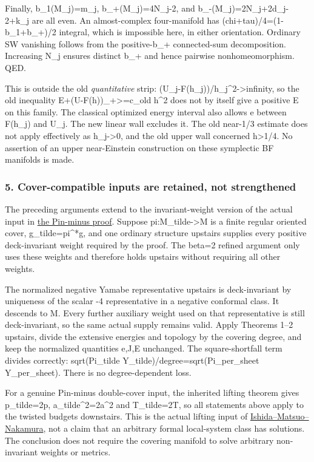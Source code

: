 \documentclass[
  10pt,
]{article}
\begin{document}
Finally, b\_1(M\_j)=m\_j, b\_+(M\_j)=4N\_j-2, and
b\_-(M\_j)=2N\_j+2d\_j-2+k\_j are all even. An almost-complex
four-manifold has (chi+tau)/4=(1-b\_1+b\_+)/2 integral, which is
impossible here, in either orientation. Ordinary SW vanishing follows
from the positive-b\_+ connected-sum decomposition. Increasing N\_j
ensures distinct b\_+ and hence pairwise nonhomeomorphism. QED.

This is outside the old \emph{quantitative} strip:
(U\_j-F(h\_j))/h\_j\^{}2-\textgreater infinity, so the old inequality
E+(U-F(h))\_+\textgreater=c\_old h\^{}2 does not by itself give a
positive E on this family. The classical optimized energy interval also
allows e between F(h\_j) and U\_j. The new linear wall excludes it. The
old near-1/3 estimate does not apply effectively as h\_j-\textgreater0,
and the old upper wall concerned h\textgreater1/4. No assertion of an
upper near-Einstein construction on these symplectic BF manifolds is
made.

\hypertarget{cover-compatible-inputs-are-retained-not-strengthened}{%
\subsubsection{5. Cover-compatible inputs are retained, not
strengthened}\label{cover-compatible-inputs-are-retained-not-strengthened}}

The preceding arguments extend to the invariant-weight version of the
actual input in
\href{../mathematics/current/round14_twisted_rigidity.md}{the Pin-minus
proof}. Suppose pi:M\_tilde-\textgreater M is a finite regular oriented
cover, g\_tilde=pi\^{}*g, and one ordinary structure upstairs supplies
every positive deck-invariant weight required by the proof. The beta=2
refined argument only uses these weights and therefore holds upstairs
without requiring all other weights.

The normalized negative Yamabe representative upstairs is deck-invariant
by uniqueness of the scalar -4 representative in a negative conformal
class. It descends to M. Every further auxiliary weight used on that
representative is still deck-invariant, so the same actual supply
remains valid. Apply Theorems 1--2 upstairs, divide the extensive
energies and topology by the covering degree, and keep the normalized
quantities e,J,E unchanged. The square-shortfall term divides correctly:
sqrt(Pi\_tilde Y\_tilde)/degree=sqrt(Pi\_per\_sheet Y\_per\_sheet).
There is no degree-dependent loss.

For a genuine Pin-minus double-cover input, the inherited lifting
theorem gives p\_tilde=2p, a\_tilde\^{}2=2a\^{}2 and T\_tilde=2T, so all
statements above apply to the twisted budgets downstairs. This is the
actual lifting input of
\href{https://arxiv.org/pdf/1505.05948}{Ishida--Matsuo--Nakamura}, not a
claim that an arbitrary formal local-system class has solutions. The
conclusion does not require the covering manifold to solve arbitrary
non-invariant weights or metrics.
\end{document}
